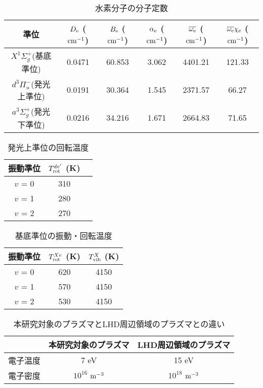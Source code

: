 \listoftables
{}

\begin{table}
    \caption{水素分子の分子定数\cite{nist}}
    \label{table:molecular-constants}
    \centering
    \begin{tabular}{cccccc}
        \hline
        準位 & $D_{\rm e}$ ($\rm cm^{-1}$)& $B_{\rm e}$ ($\rm cm^{-1}$)& $\alpha_{\rm e}$ ($\rm cm^{-1}$)& $\overline{\omega_{\rm e}}$ ($\rm cm^{-1}$)& $\overline{\omega_{\rm e}} \chi_{\rm e}$ ($\rm cm^{-1}$)\\
        \hline
        $X^1 \Sigma^+_g$(基底準位) & 0.0471 & 60.853 & 3.062 & 4401.21 & 121.33\\
        $d^3 \Pi^-_u$(発光上準位) & 0.0191 & 30.364 & 1.545 & 2371.57 & 66.27\\
        $a^3 \Sigma^+_g$(発光下準位) & 0.0216 & 34.216 & 1.671 & 2664.83 & 71.65\\
        \hline
    \end{tabular}
\end{table}

\begin{table}
    \caption{発光上準位の回転温度}
    \label{table:upper-temperatures}
    \centering
    \begin{tabular}{ccc}
        \hline
        振動準位 & $T^{dv'}_{\rm rot}$ (K)\\
        \hline
        $v$ = 0 & 310\\
        $v$ = 1 & 280\\
        $v$ = 2 & 270\\
        \hline
    \end{tabular}
\end{table}

\begin{table}
    \caption{基底準位の振動・回転温度}
    \label{table:fitting-result}
    \centering
    \begin{tabular}{ccc}
        \hline
        振動準位 & $T^{Xv}_{\rm rot}$ (K) & $T^{X}_{\rm vib}$ (K)\\
        \hline
        $v$ = 0 & 620 & 4150\\
        $v$ = 1 & 570 & 4150\\
        $v$ = 2 & 530 & 4150\\
        \hline
    \end{tabular}
\end{table}

\begin{table}
    \caption{本研究対象のプラズマとLHD周辺領域のプラズマ\cite{ishihara}との違い}
    \label{table:LHD-and-this-plasma}
    \centering
    \begin{tabular}{ccc}
        \hline
         & 本研究対象のプラズマ & LHD周辺領域のプラズマ\\
        \hline
        電子温度 & 7 eV & 15 eV\\
        電子密度 & $10^{16}$ $\rm m^{-3}$ & $10^{18}$ $\rm m^{-3}$\\
        \hline
    \end{tabular}
\end{table}

